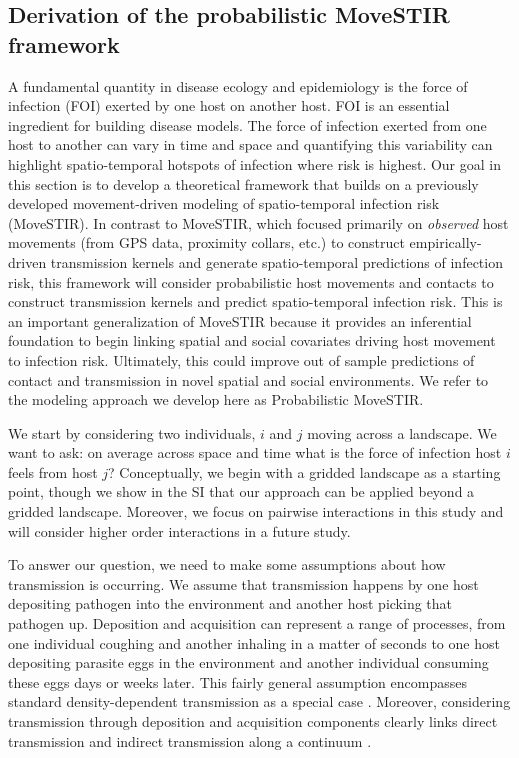 \documentclass[letterpaper]{article}
\begin{document}
\subsection*{Derivation of the probabilistic MoveSTIR framework}

A fundamental quantity in disease ecology and epidemiology is the force of infection (FOI) exerted by one host on another host. FOI is an essential ingredient for building disease models.  The force of infection exerted from one host to another can vary in time and space and quantifying this variability can highlight spatio-temporal hotspots of infection where risk is highest.  Our goal in this section is to develop a theoretical framework that builds on a previously developed movement-driven modeling of spatio-temporal infection risk (MoveSTIR).  In contrast to MoveSTIR, which focused primarily on \emph{observed} host movements (from GPS data, proximity collars, etc.) to construct empirically-driven transmission kernels and generate spatio-temporal predictions of infection risk, this framework will consider probabilistic host movements and contacts to construct transmission kernels and predict spatio-temporal infection risk. This is an important generalization of MoveSTIR because it provides an inferential foundation to begin linking spatial and social covariates driving host movement to infection risk.  Ultimately, this could improve out of sample predictions of contact and transmission in novel spatial and social environments.  We refer to the modeling approach we develop here as Probabilistic MoveSTIR.     

We start by considering two individuals, $i$ and $j$ moving across a landscape.  We want to ask: on average across space and time what is the force of infection host $i$ feels from host $j$?   Conceptually, we begin with a gridded landscape as a starting point, though we show in the SI that our approach can be applied beyond a gridded landscape.  Moreover, we focus on pairwise interactions in this study and will consider higher order interactions in a future study.   

To answer our question, we need to make some assumptions about how transmission is occurring.  We assume that transmission happens by one host depositing pathogen into the environment and another host picking that pathogen up.  Deposition and acquisition can represent a range of processes, from one individual coughing and another inhaling in a matter of seconds to one host depositing parasite eggs in the environment and another individual consuming these eggs days or weeks later.  This fairly general assumption encompasses standard density-dependent transmission as a special case \citep{Cortez2021}.  Moreover, considering transmission through deposition and acquisition components clearly links direct transmission and indirect transmission along a continuum \citep{Wilber2022}.  
\end{document}
